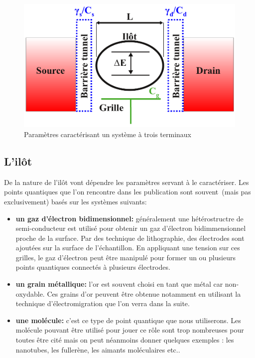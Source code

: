 \begin{figure}
\includegraphics[scale=1]{Theorie/Transport/figure1/figure1ThTr.pdf} 
\caption{Paramètres caractérisant un système à trois terminaux}
\label{description_systeme}
\end{figure}



\subsection{L'il\^ot}
De la nature de l'il\^ot vont dépendre les paramètres servant à le caractériser. Les points quantiques que l'on rencontre dans les publication sont souvent~(mais pas exclusivement) basés sur les systèmes suivants:
\begin{itemize}
\item \textbf{un gaz d'électron bidimensionnel:} généralement une hétérostructre de semi-conducteur est utilisé pour obtenir un gaz d'électron bidimmensionnel proche de la surface. Par des technique de lithographie, des électrodes sont ajoutées sur la surface de l'échantillon. En appliquant une tension sur ces grilles, le gaz d'électron peut \^etre manipulé pour former un ou plusieurs points quantiques connectés à plusieurs électrodes.
\item \textbf{un grain métallique:} l'or est souvent choisi en tant que métal car non-oxydable. Ces grains d'or peuvent \^etre obtenue notamment en utilisant la technique d'électromigration que l'on verra dans la suite.
\item \textbf{une molécule:} c'est ce type de point quantique que nous utiliserons. Les molécule pouvant \^etre utilisé pour jouer ce r\^ole sont trop nombreuses pour toutes \^etre cité mais on peut néanmoins donner quelques exemples : les nanotubes, les fullerène, les aimants moléculaires etc.. \newline
\end{itemize}

